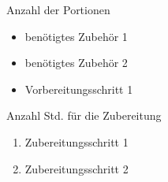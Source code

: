 \documentclass{lazept}
\begin{document}


\noindent
\begin{minipage}[t]{0.5\textwidth}

\begin{ingredients}{Anzahl der Portionen}





\end{ingredients}

\end{minipage}
\begin{minipage}[t]{0.5\textwidth}

\begin{utensils}

 \begin{itemize}
  \item benötigtes Zubehör 1
  \item benötigtes Zubehör 2
 \end{itemize}
  
  
\end{utensils}


\begin{prep}
 
 \begin{itemize}
  \item Vorbereitungsschritt 1
 \end{itemize}
 
\end{prep} 

\end{minipage}


\begin{preparation}{Anzahl Std. für die Zubereitung}
 
 \begin{enumerate}
  \item Zubereitungsschritt 1
  \item Zubereitungsschritt 2
  
 \end{enumerate}

\end{preparation}
\end{document}
